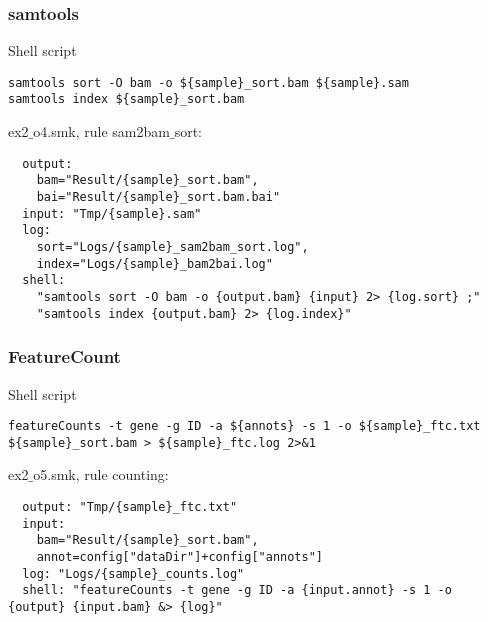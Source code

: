 \begin{frame}[containsverbatim]
\frametitle{samtools}
\begin{exampleblock}{Shell script}
\begin{lstlisting}
samtools sort -O bam -o ${sample}_sort.bam ${sample}.sam
samtools index ${sample}_sort.bam
\end{lstlisting}
\end{exampleblock}
\begin{exampleblock}{ex2$\_$o4.smk, rule sam2bam$\_$sort:}
\begin{lstlisting}
  output:
    bam="Result/{sample}_sort.bam",
    bai="Result/{sample}_sort.bam.bai"
  input: "Tmp/{sample}.sam"
  log:
    sort="Logs/{sample}_sam2bam_sort.log",
    index="Logs/{sample}_bam2bai.log"
  shell: 
    "samtools sort -O bam -o {output.bam} {input} 2> {log.sort} ;"
    "samtools index {output.bam} 2> {log.index}"
\end{lstlisting}
\end{exampleblock}
\end{frame}
\begin{frame}[containsverbatim]
\frametitle{FeatureCount}
\begin{exampleblock}{Shell script}
\begin{lstlisting}
featureCounts -t gene -g ID -a ${annots} -s 1 -o ${sample}_ftc.txt ${sample}_sort.bam > ${sample}_ftc.log 2>&1
\end{lstlisting}
\end{exampleblock}
\begin{exampleblock}{ex2$\_$o5.smk, rule counting:}
\begin{lstlisting}
  output: "Tmp/{sample}_ftc.txt"
  input:
    bam="Result/{sample}_sort.bam",
    annot=config["dataDir"]+config["annots"]
  log: "Logs/{sample}_counts.log"
  shell: "featureCounts -t gene -g ID -a {input.annot} -s 1 -o {output} {input.bam} &> {log}"
\end{lstlisting}
\end{exampleblock}
\end{frame}
